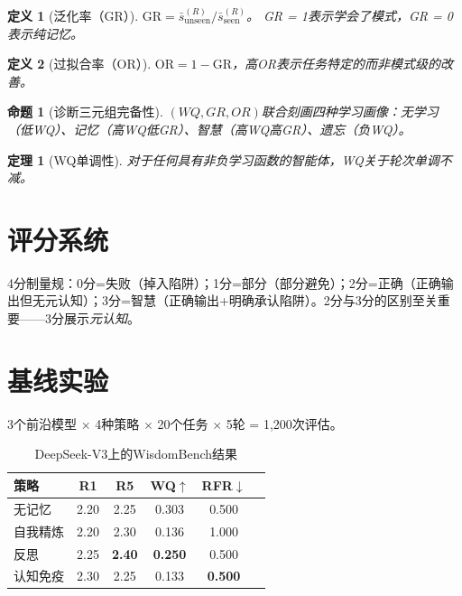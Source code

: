 \documentclass[11pt,a4paper]{article}
\newtheorem{theorem}{定理}
\newtheorem{definition}{定义}
\newtheorem{proposition}{命题}
\begin{document}
\begin{definition}[泛化率（GR）]
$\text{GR} = \bar{s}_{\text{unseen}}^{(R)} / \bar{s}_{\text{seen}}^{(R)}$。
GR = 1表示学会了\emph{模式}，GR = 0表示纯记忆。
\end{definition}

\begin{definition}[过拟合率（OR）]
$\text{OR} = 1 - \text{GR}$，高OR表示任务特定的而非模式级的改善。
\end{definition}

\begin{proposition}[诊断三元组完备性]
$(WQ, GR, OR)$联合刻画四种学习画像：无学习（低WQ）、记忆（高WQ低GR）、智慧（高WQ高GR）、遗忘（负WQ）。
\end{proposition}

\begin{theorem}[WQ单调性]
对于任何具有非负学习函数的智能体，WQ关于轮次单调不减。
\end{theorem}

\section{评分系统}

4分制量规：0分=失败（掉入陷阱）；1分=部分（部分避免）；2分=正确（正确输出但无元认知）；3分=智慧（正确输出+明确承认陷阱）。2分与3分的区别至关重要——3分展示\emph{元认知}。

\section{基线实验}

3个前沿模型 $\times$ 4种策略 $\times$ 20个任务 $\times$ 5轮 = 1,200次评估。

\begin{table}[h]
\centering
\caption{DeepSeek-V3上的WisdomBench结果}
\begin{tabular}{@{}lccccc@{}}
\toprule
\textbf{策略} & \textbf{R1} & \textbf{R5} & \textbf{WQ}$\uparrow$ & \textbf{RFR}$\downarrow$ \\
\midrule
无记忆 & 2.20 & 2.25 & 0.303 & 0.500 \\
自我精炼 & 2.20 & 2.30 & 0.136 & 1.000 \\
反思 & 2.25 & \textbf{2.40} & \textbf{0.250} & 0.500 \\
认知免疫 & 2.30 & 2.25 & 0.133 & \textbf{0.500} \\
\bottomrule
\end{tabular}
\end{table}
\end{document}
